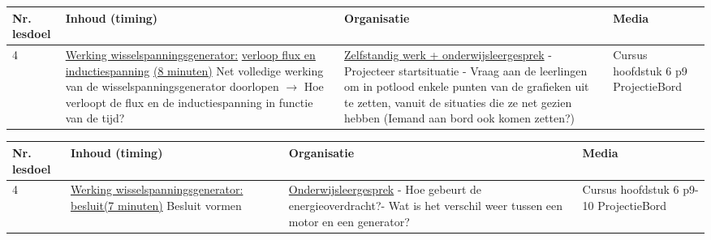 \begin{landscape}
\begin{tabularx}{1.56\textwidth}{|p{1.5cm}|p{8cm}|X|p{4cm}|}
	\hline
	\textbf{Nr. lesdoel } & \textbf{Inhoud (timing)}  & \textbf{Organisatie } & \textbf{Media } \\ \hline
	4& \underline{Werking wisselspanningsgenerator:} \underline{verloop flux en inductiespanning} \underline{(8 minuten)}\newline
	Net volledige werking van de wisselspanningsgenerator doorlopen $\rightarrow$  Hoe verloopt de flux  en de inductiespanning in functie van de tijd?
	&  \underline{Zelfstandig werk + onderwijsleergesprek}\newline  
	- Projecteer startsituatie \newline
	- Vraag aan de leerlingen om in potlood enkele punten van de grafieken uit te zetten, vanuit de situaties die ze net gezien hebben (Iemand aan bord ook komen zetten?)\newline
	&  Cursus hoofdstuk 6 p9 \newline\newline Projectie\newline\newline Bord
	\\ \hline
\end{tabularx}\vspace{5mm}



\begin{tabularx}{1.56\textwidth}{|p{1.5cm}|p{8cm}|X|p{4cm}|}
	\hline
	\textbf{Nr. lesdoel } & \textbf{Inhoud (timing)}  & \textbf{Organisatie } & \textbf{Media } \\ \hline
	4& \underline{Werking wisselspanningsgenerator:} \underline{besluit(7 minuten)}\newline 
	Besluit vormen 
	&  \underline{Onderwijsleergesprek}\newline  
	- Hoe gebeurt de energieoverdracht?\newline - Wat is het verschil weer tussen een motor en een generator?
	&  Cursus hoofdstuk 6 p9-10 \newline\newline Projectie\newline\newline Bord
	\\ \hline
\end{tabularx}\vspace{5mm}





\end{landscape}

